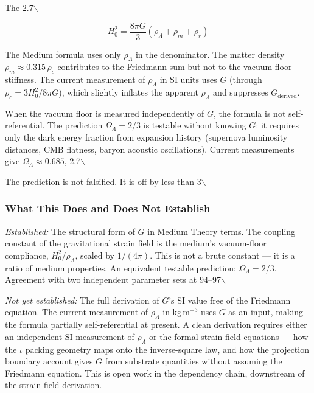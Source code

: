 \documentclass[11pt,letterpaper]{article}
\begin{document}
The 2.7$\backslash$%

\[
H_0^2 = \frac{8\pi G}{3}(\rho_\Lambda + \rho_m + \rho_r)
\]

The Medium formula uses only \(\rho_\Lambda\) in the denominator. The matter density \(\rho_m \approx 0.315\,\rho_c\) contributes to the Friedmann sum but not to the vacuum floor stiffness. The current measurement of \(\rho_\Lambda\) in SI units uses \(G\) (through \(\rho_c = 3H_0^2/8\pi G\)), which slightly inflates the apparent \(\rho_\Lambda\) and suppresses \(G_{\mathrm{derived}}\).

When the vacuum floor is measured independently of \(G\), the formula is not self-referential. The prediction \(\Omega_\Lambda = 2/3\) is testable without knowing \(G\): it requires only the dark energy fraction from expansion history (supernova luminosity distances, CMB flatness, baryon acoustic oscillations). Current measurements give \(\Omega_\Lambda \approx 0.685\), 2.7$\backslash$%

The prediction is not falsified. It is off by less than 3$\backslash$%

\subsubsection{What This Does and Does Not Establish}
\label{sec:orgb6ccfb6}

\emph{Established:} The structural form of \(G\) in Medium Theory terms. The coupling constant of the gravitational strain field is the medium's vacuum-floor compliance, \(H_0^2/\rho_\Lambda\), scaled by \(1/(4\pi)\). This is not a brute constant --- it is a ratio of medium properties. An equivalent testable prediction: \(\Omega_\Lambda = 2/3\). Agreement with two independent parameter sets at 94--97$\backslash$%

\emph{Not yet established:} The full derivation of \(G\)'s SI value free of the Friedmann equation. The current measurement of \(\rho_\Lambda\) in \(\mathrm{kg\,m^{-3}}\) uses \(G\) as an input, making the formula partially self-referential at present. A clean derivation requires either an independent SI measurement of \(\rho_\Lambda\) or the formal strain field equations --- how the \(\iota\) packing geometry maps onto the inverse-square law, and how the projection boundary account gives \(G\) from substrate quantities without assuming the Friedmann equation. This is open work in the dependency chain, downstream of the strain field derivation.
\end{document}
